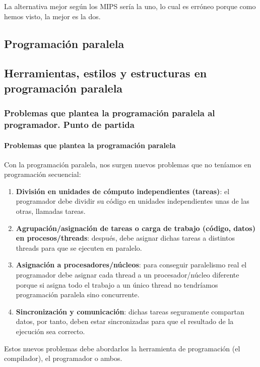 \documentclass[10pt,a4paper,spanish]{report}
\begin{document}
La alternativa mejor según los MIPS sería la uno, lo cual es erróneo porque como hemos visto, la mejor es la dos.

\textcolor[rgb]{0.2,0.4,0.8}{\chapter{Programación paralela}}
\setcounter{section}{3}
\textcolor[rgb]{0.2,0.4,0.8}{\section{Herramientas, estilos y estructuras en programación paralela}}
\textcolor[rgb]{0.2,0.4,0.8}{\subsection{Problemas que plantea la programación paralela al programador. Punto de partida}}
\textcolor[rgb]{0.2,0.4,0.8}{\subsubsection{Problemas que plantea la programación paralela}}
Con la programación paralela, nos surgen nuevos problemas que no teníamos en programación secuencial:
\begin{enumerate}[\color{azul}{\bf $\heartsuit$}]
    \item \textcolor[rgb]{0.2,0.4,0.8}{\textbf{División en unidades de cómputo independientes (tareas)}}: el programador debe dividir su código en unidades independientes unas de las otras, llamadas tareas.
    \item \textcolor[rgb]{0.2,0.4,0.8}{\textbf{Agrupación/asignación de tareas o carga de trabajo (código, datos) en procesos/threads}}: después, debe asignar dichas tareas a distintos threads para que se ejecuten en paralelo.
    \item \textcolor[rgb]{0.2,0.4,0.8}{\textbf{Asignación a procesadores/núcleos}}: para conseguir paralelismo real el programador debe asignar cada thread a un procesador/núcleo diferente porque si asigna todo el trabajo a un único thread no tendríamos programación paralela sino concurrente.
    \item \textcolor[rgb]{0.2,0.4,0.8}{\textbf{Sincronización y comunicación}}: dichas tareas seguramente compartan datos, por tanto, deben estar sincronizadas para que el resultado de la ejecución sea correcto.
\end{enumerate}

Estos nuevos problemas debe abordarlos la herramienta de programación (el compilador), el programador o ambos.
\end{document}
